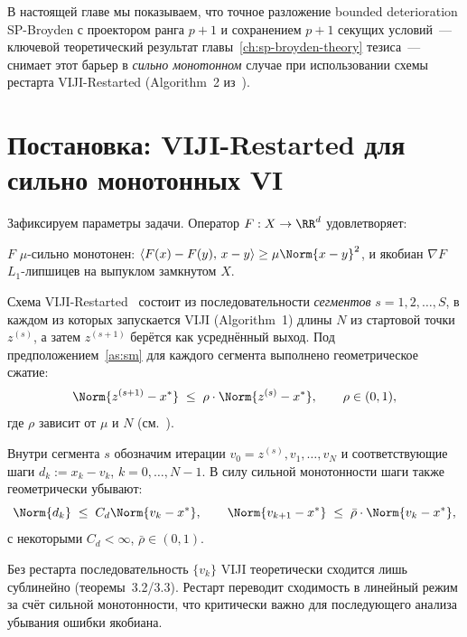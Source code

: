 В настоящей главе мы показываем, что точное разложение bounded
deterioration SP-Broyden с проектором ранга $p{+}1$ и сохранением $p{+}1$
секущих условий~--- ключевой теоретический результат
главы~\ref{ch:sp-broyden-theory} тезиса~--- снимает этот барьер
в \emph{сильно монотонном} случае при использовании схемы рестарта
VIJI-Restarted (Algorithm~2 из~\cite{Agafonov2024VIJI}).

\section{Постановка: VIJI-Restarted для сильно монотонных VI}
\label{sec:viji:setup}

Зафиксируем параметры задачи. Оператор $F: X \to \RR^d$ удовлетворяет:

\begin{assumption}
\label{as:sm}
$F$ $\mu$-сильно монотонен: $\langle F(x) - F(y),\, x-y\rangle \ge \mu\Norm{x-y}^2$,
и якобиан $\nabla F$ $L_1$-липшицев на выпуклом замкнутом $X$.
\end{assumption}

Схема VIJI-Restarted~\cite[Algorithm~2]{Agafonov2024VIJI} состоит из
последовательности \emph{сегментов} $s = 1, 2, \ldots, S$, в каждом из которых
запускается VIJI (Algorithm~1) длины $N$ из стартовой точки $z^{(s)}$, а затем
$z^{(s+1)}$ берётся как усреднённый выход. Под предположением~\ref{as:sm} для
каждого сегмента выполнено геометрическое сжатие:
\begin{equation}
\Norm{z^{(s+1)} - x^{*}} \;\le\; \rho \cdot \Norm{z^{(s)} - x^{*}},
\qquad \rho \in (0, 1),
\label{eq:restart-geom}
\end{equation}
где $\rho$ зависит от $\mu$ и $N$ (см.~\cite[Theorem~4.2]{Agafonov2024VIJI}).

Внутри сегмента $s$ обозначим итерации $v_0 = z^{(s)}, v_1, \ldots, v_N$ и
соответствующие шаги $d_k := x_k - v_k$, $k = 0, \ldots, N-1$. В силу
сильной монотонности шаги также геометрически убывают:
\begin{equation}
\Norm{d_k} \;\le\; C_d \Norm{v_k - x^{*}},
\qquad
\Norm{v_{k+1} - x^{*}} \;\le\; \bar\rho \cdot \Norm{v_k - x^{*}},
\label{eq:inner-geom}
\end{equation}
с некоторыми $C_d < \infty$, $\bar\rho \in (0, 1)$.

\begin{remark}
\label{rem:why-restart}
Без рестарта последовательность $\{v_k\}$ VIJI теоретически сходится лишь
сублинейно (теоремы~3.2/3.3). Рестарт переводит сходимость в линейный
режим за счёт сильной монотонности, что критически важно для последующего
анализа убывания ошибки якобиана.
\end{remark}


